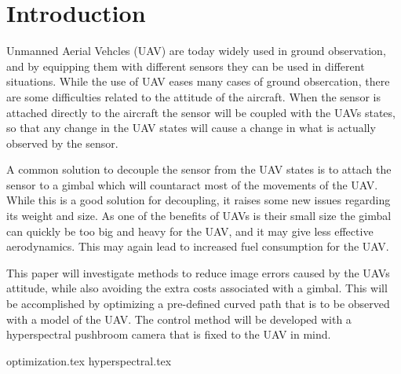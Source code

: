 \chapter{Introduction}

Unmanned Aerial Vehcles (UAV) are today widely used in ground observation, and by equipping them with different sensors they can be used in different situations. While the use of UAV eases many cases of ground obsercation, there are some difficulties related to the attitude of the aircraft. When the sensor is attached directly to the aircraft the sensor will be coupled with the UAVs states, so that any change in the UAV states will cause a change in what is actually observed by the sensor.

A common solution to decouple the sensor from the UAV states is to attach the sensor to a gimbal which will countaract most of the movements of the UAV. While this is a good solution for decoupling, it raises some new issues regarding its weight and size. As one of the benefits of UAVs is their small size the gimbal can quickly be too big and heavy for the UAV, and it may give less effective aerodynamics. This may again lead to increased fuel consumption for the UAV.

This paper will investigate methods to reduce image errors caused by the UAVs attitude, while also avoiding the extra costs associated with a gimbal. This will be accomplished by optimizing a pre-defined curved path that is to be observed with a model of the UAV. The control method will be developed with a hyperspectral pushbroom camera that is fixed to the UAV in mind.

{optimization.tex}
{hyperspectral.tex}